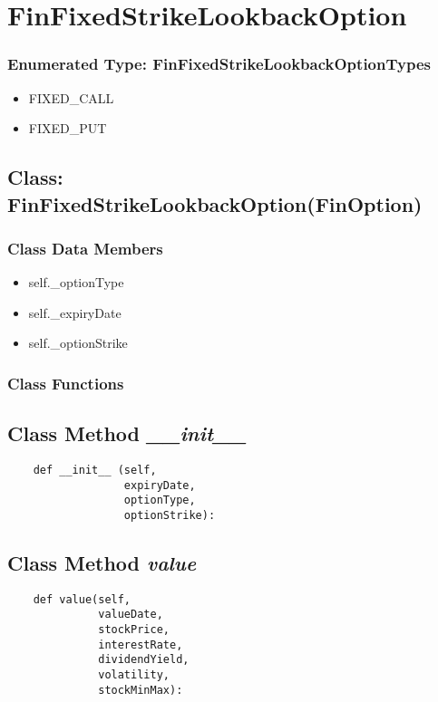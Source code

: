 \documentclass[twoside,11pt]{book}
\begin{document}
\newpage
\section{FinFixedStrikeLookbackOption}

\subsubsection{Enumerated Type: FinFixedStrikeLookbackOptionTypes}
\begin{itemize}
\item{FIXED\_CALL}
\item{FIXED\_PUT}
\end{itemize}

\subsection{Class: FinFixedStrikeLookbackOption(FinOption)}


\subsubsection{Class Data Members}
\begin{itemize}
\item{self.\_optionType}
\item{self.\_expiryDate}
\item{self.\_optionStrike}
\end{itemize}

\subsubsection{Class Functions}

\subsection{Class Method {\it \_\_init\_\_ }}


\begin{lstlisting}
    def __init__ (self,
                  expiryDate,
                  optionType, 
                  optionStrike):
\end{lstlisting}

\subsection{Class Method {\it value}}


\begin{lstlisting}
    def value(self,
              valueDate,
              stockPrice,
              interestRate,
              dividendYield,
              volatility, 
              stockMinMax):
\end{lstlisting}
\end{document}
